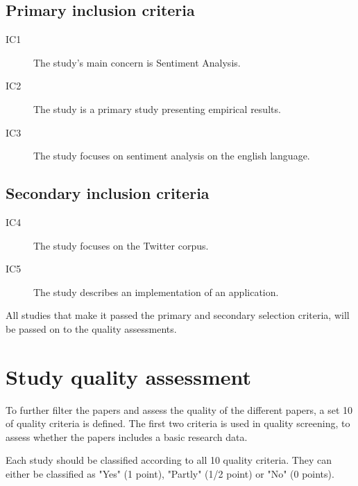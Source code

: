 \subsection{Primary inclusion criteria}

\begin{description}

\item[IC1] The study’s main concern is Sentiment Analysis.
\item[IC2] The study is a primary study presenting empirical results.
\item[IC3] The study focuses on sentiment analysis on the english language.

\end{description}

\subsection{Secondary inclusion criteria}

\begin{description}


\item[IC4] The study focuses on the Twitter corpus.
\item[IC5] The study describes an implementation of an application.

\end{description}

All studies that make it passed the primary and secondary selection criteria, will be passed on to the quality assessments. 

\section{Study quality assessment}

To further filter the papers and assess the quality of the different papers, a set 10 of quality criteria is defined. The first two criteria is used in quality screening, to assess whether the papers includes a basic research data.

Each study should be classified according to all 10 quality criteria. They can either be classified as "Yes" (1 point), "Partly" (1/2 point) or "No" (0 points).


